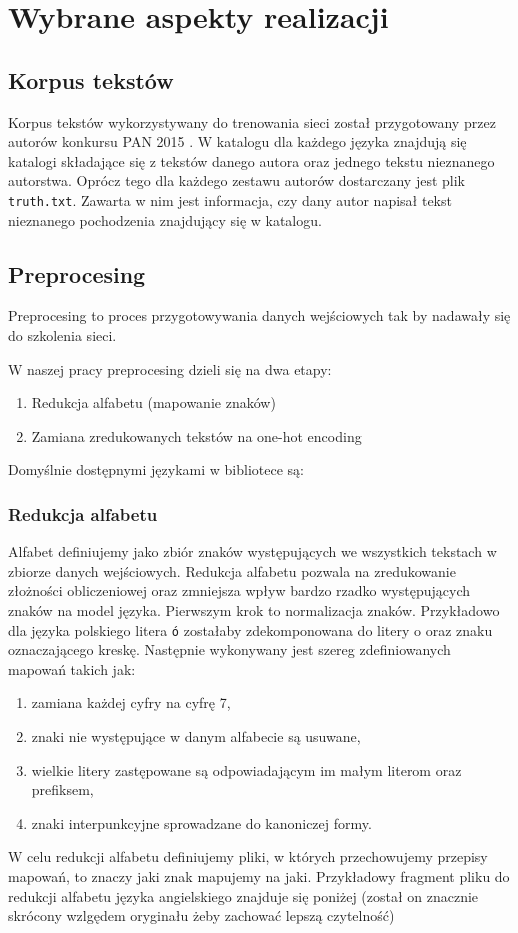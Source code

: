 \newpage
\section{Wybrane aspekty realizacji}

\subsection{Korpus tekstów}
Korpus tekstów wykorzystywany do trenowania sieci został przygotowany przez autorów konkursu PAN 2015 \cite{pan}.
W katalogu dla każdego języka znajdują się katalogi składające się z tekstów danego autora oraz jednego
tekstu nieznanego autorstwa. Oprócz tego dla każdego zestawu autorów dostarczany jest plik \texttt{truth.txt}.
Zawarta w nim jest informacja, czy dany autor napisał tekst nieznanego pochodzenia znajdujący się w katalogu.

\subsection{Preprocesing}
Preprocesing to proces przygotowywania danych wejściowych tak by nadawały się do szkolenia sieci.

W naszej pracy preprocesing dzieli się na dwa etapy:
\begin{enumerate}
	\item Redukcja alfabetu (mapowanie znaków)
	\item Zamiana zredukowanych tekstów na one-hot encoding
\end{enumerate}

Domyślnie dostępnymi językami w bibliotece są:
\languages 
 

\subsubsection{Redukcja alfabetu}
Alfabet definiujemy jako zbiór znaków występujących we wszystkich tekstach w zbiorze danych wejściowych. 
Redukcja alfabetu pozwala na zredukowanie złożności obliczeniowej oraz zmniejsza wpływ bardzo rzadko
występujących znaków na model języka. Pierwszym krok to normalizacja znaków. 
Przykładowo dla języka polskiego litera \texttt{ó} zostałaby zdekomponowana do litery o oraz znaku oznaczającego kreskę.
Następnie wykonywany jest szereg zdefiniowanych mapowań takich jak:
\begin{enumerate}
  \item zamiana każdej cyfry na cyfrę 7,
  \item znaki nie występujące w danym alfabecie są usuwane,
  \item wielkie litery zastępowane są odpowiadającym im małym literom oraz prefiksem,
  \item znaki interpunkcyjne sprowadzane do kanoniczej formy.
\end{enumerate}
\newpage
W celu redukcji alfabetu definiujemy pliki, w których przechowujemy przepisy mapowań, to znaczy
jaki znak mapujemy na jaki. Przykładowy fragment pliku do redukcji alfabetu języka
angielskiego znajduje się poniżej (został on znacznie skrócony wzlgędem oryginału żeby zachować lepszą
czytelność)

